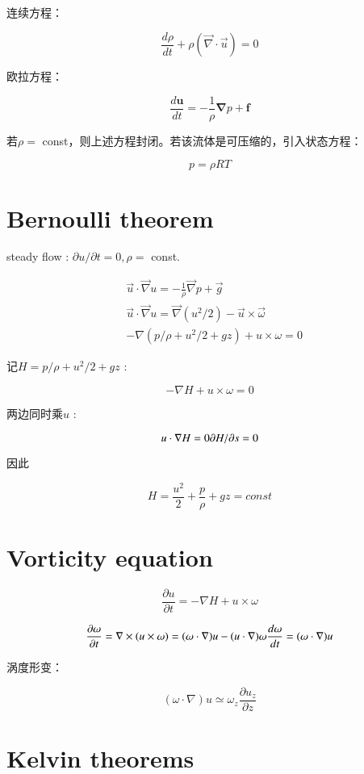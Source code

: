 \documentclass[fontset=windows]{report}
\begin{document}
连续方程：

\[\frac{d \rho}{dt}+\rho(\vec \nabla\cdot\vec u)=0\]

欧拉方程：

\[\frac{d\boldsymbol u}{dt}=-\frac{1}{\rho}\boldsymbol\nabla p+\boldsymbol f\]

若\(\rho=\) const，则上述方程封闭。若该流体是可压缩的，引入状态方程：

\[p=\rho R T\]

\section{Bernoulli theorem}

steady flow : \(\partial u/\partial t=0, \rho=\) const.

\begin{align}
&\vec u \cdot \vec \nabla u =- \frac{1}{\rho}\vec \nabla p+\vec g \\
&\vec u\cdot \vec \nabla u = \vec \nabla(u^2/2)-\vec u\times\vec \omega\\
&-\nabla(p/\rho+u^2/2+gz)+u\times\omega = 0
\end{align}

记\(H =p/\rho+u^2/2+gz\) :

\[-\nabla H+u\times \omega=0\]

两边同时乘\(u\) :

\[u\cdot\nabla H=0\\
\partial H/\partial s = 0\]

因此

\[H = \frac{u^2}{2}+\frac{p}{\rho}+gz=const\]

\section{Vorticity equation}

\[\frac{\partial u}{\partial t}=-\nabla H+u\times\omega\]

\[\frac{\partial \omega}{\partial t}=\nabla\times(u\times\omega)=(\omega\cdot \nabla)u-(u\cdot\nabla)\omega\\
\frac{d\omega}{dt}=(\omega\cdot\nabla)u\]

涡度形变：

\[(\omega\cdot\nabla)u \simeq \omega_z\frac{\partial u_z}{\partial z}\]

\section{Kelvin theorems}
\end{document}
